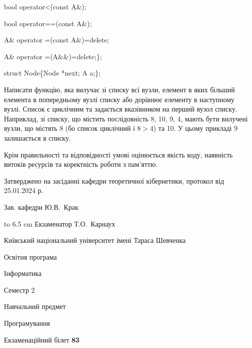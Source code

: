\documentclass[12pt, ukrainian]{article}
\begin{document}
{\quad  bool operator<(const A\&); 

\quad  bool operator==(const A\&); 

\quad A\& operator =(const A\&)=delete; 

\quad  A\& operator =(A\&\&)=delete;\};

struct Node\{Node *next; A a;\};

 Написати функцію, яка вилучає зі списку всі вузли, елемент в яких більший елемента в попередньому вузлі списку або дорівнює елементу в наступному вузлі. Список є циклічним та задається вказівником на перший вузол списку. Наприклад, зі списку, що містить послідовність 8, 10, 9, 4, мають бути вилучені вузли, що містять 8 (бо список циклічний і $8>4$) та 10. У цьому прикладі 9 залишається в списку.

Крім правильності та відповідності умові оцінюється якість коду, наявність витоків ресурсів та коректність роботи з пам'яттю. 

}
{\smallskip\smallskip \begin {scriptsize} Затверджено на засіданні кафедри теоретичної кібернетики, протокол   від   25.01.2024 р.\par\smallskip\smallskip\smallskip\smallskip
{\parbox {6.5 cm} {Зав. кафедри \dotfill Ю.В.~Крак}}\hspace {0.7cm} {\hbox to 6.5 cm { Екзаменатор \dotfill Т.О.~Карнаух}} \end{scriptsize}}
\newpage
{{\begin {scriptsize}\par
{ \center  Київський національний університет імені Тараса Шевченка \par}
{\parbox {5 cm}{Освітня програма \hfill}{\parbox {7 cm}{Інформатика\hfill}}\parbox {6 cm}{\hfill Семестр 2}}\par
{\parbox {5 cm} {Навчальний предмет \hfill}\parbox {7 cm}{Програмування \hfill}\parbox {6cm}{\hfill}\par}\vspace{-15pt} \end{scriptsize}}{\center Екзаменаційний білет \No \textbf { 83 }\par}}
\end{document}
